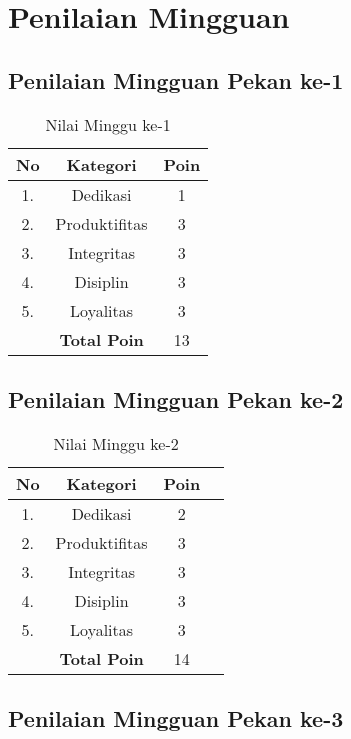 \section{Penilaian Mingguan}

\subsection{Penilaian Mingguan Pekan ke-1}

\begin{table}[htp]
\centering
\caption{Nilai Minggu ke-1}
\label{tab:nm01}
\begin{tabular}{|c|c|c|}
\hline
\textbf{No} & \textbf{Kategori} & \textbf{Poin} \\ \hline
1. & Dedikasi & 1 \\ \hline
2. & Produktifitas & 3 \\ \hline
3. & Integritas & 3 \\ \hline
4. & Disiplin & 3 \\ \hline
5. & Loyalitas & 3 \\ \hline
 & \textbf{Total Poin} & 13 \\ \hline
\end{tabular}
\end{table}

\subsection{Penilaian Mingguan Pekan ke-2}

\begin{table}[htp]
\centering
\caption{Nilai Minggu ke-2}
\label{tab:nm02}
\begin{tabular}{|c|c|c|p{\textwidth}|}
\hline
\textbf{No} & \textbf{Kategori} & \textbf{Poin} \\ \hline
1. & Dedikasi & 2 \\ \hline
2. & Produktifitas & 3 \\ \hline
3. & Integritas & 3 \\ \hline
4. & Disiplin & 3 \\ \hline
5. & Loyalitas & 3 \\ \hline
 & \textbf{Total Poin} & 14 \\ \hline
\end{tabular}
\end{table}

\subsection{Penilaian Mingguan Pekan ke-3}

